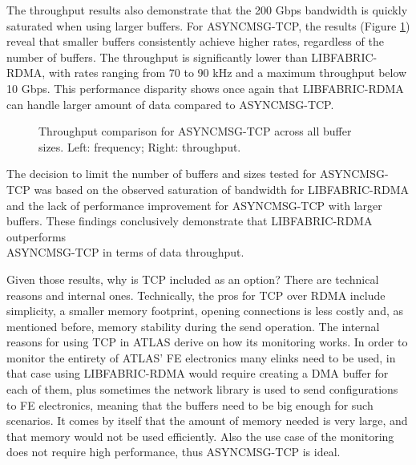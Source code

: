 The throughput results also demonstrate that the 200 Gbps bandwidth is quickly saturated when using larger buffers.
For ASYNCMSG-TCP, the results (Figure \ref{fig:tcp-mean-throughput-comparison}) reveal that smaller buffers consistently achieve higher rates, regardless of the number of buffers. The throughput is significantly lower than LIBFABRIC-RDMA, with rates ranging from 70 to 90 kHz and a maximum throughput below 10 Gbps. This performance disparity shows once again that LIBFABRIC-RDMA can handle larger amount of data compared to ASYNCMSG-TCP.

\begin{figure}[htbp]
\centering
{}
\caption[Throughput comparison for ASYNCMSG-TCP across all buffer sizes]{Throughput comparison for ASYNCMSG-TCP across all buffer sizes. Left: frequency; Right: throughput.}
\label{fig:tcp-mean-throughput-comparison}
\end{figure}

The decision to limit the number of buffers and sizes tested for ASYNCMSG-TCP was based on the observed saturation of bandwidth for LIBFABRIC-RDMA and the lack of performance improvement for ASYNCMSG-TCP with larger buffers. These findings conclusively demonstrate that LIBFABRIC-RDMA outperforms\\ ASYNCMSG-TCP in terms of data throughput.

Given those results, why is TCP included as an option? There are technical reasons and internal ones. Technically, the pros for TCP over RDMA include simplicity, a smaller memory footprint, opening connections is less costly and, as mentioned before, memory stability during the send operation. 
The internal reasons for using TCP in \acs{ATLAS} derive on how its monitoring works. In order to monitor the entirety of \acs{ATLAS}' \acl{FE} electronics many elinks need to be used, in that case using LIBFABRIC-RDMA would require creating a \acs{DMA} buffer for each of them, plus sometimes the network library is used to send configurations to \acs{FE} electronics, meaning that the buffers need to be big enough for such scenarios. It comes by itself that the amount of memory needed is very large, and that memory would not be used efficiently. Also the use case of the monitoring does not require high performance, thus ASYNCMSG-TCP is ideal.

